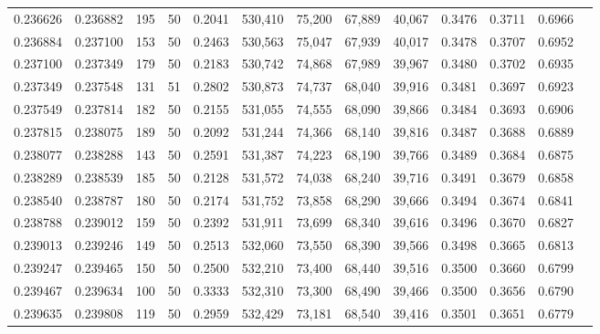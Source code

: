 \begin{tabular}{rrrrrrrrrrrrr}
0.236626 & 0.236882 &   195 &  50 &                                     0.2041 & 530,410 &  75,200 &  67,889 &  40,067 & 0.3476 & 0.3711 & 0.6966 \\
0.236884 & 0.237100 &   153 &  50 &                                     0.2463 & 530,563 &  75,047 &  67,939 &  40,017 & 0.3478 & 0.3707 & 0.6952 \\
0.237100 & 0.237349 &   179 &  50 &                                     0.2183 & 530,742 &  74,868 &  67,989 &  39,967 & 0.3480 & 0.3702 & 0.6935 \\
0.237349 & 0.237548 &   131 &  51 &                                     0.2802 & 530,873 &  74,737 &  68,040 &  39,916 & 0.3481 & 0.3697 & 0.6923 \\
0.237549 & 0.237814 &   182 &  50 &                                     0.2155 & 531,055 &  74,555 &  68,090 &  39,866 & 0.3484 & 0.3693 & 0.6906 \\
0.237815 & 0.238075 &   189 &  50 &                                     0.2092 & 531,244 &  74,366 &  68,140 &  39,816 & 0.3487 & 0.3688 & 0.6889 \\
0.238077 & 0.238288 &   143 &  50 &                                     0.2591 & 531,387 &  74,223 &  68,190 &  39,766 & 0.3489 & 0.3684 & 0.6875 \\
0.238289 & 0.238539 &   185 &  50 &                                     0.2128 & 531,572 &  74,038 &  68,240 &  39,716 & 0.3491 & 0.3679 & 0.6858 \\
0.238540 & 0.238787 &   180 &  50 &                                     0.2174 & 531,752 &  73,858 &  68,290 &  39,666 & 0.3494 & 0.3674 & 0.6841 \\
0.238788 & 0.239012 &   159 &  50 &                                     0.2392 & 531,911 &  73,699 &  68,340 &  39,616 & 0.3496 & 0.3670 & 0.6827 \\
0.239013 & 0.239246 &   149 &  50 &                                     0.2513 & 532,060 &  73,550 &  68,390 &  39,566 & 0.3498 & 0.3665 & 0.6813 \\
0.239247 & 0.239465 &   150 &  50 &                                     0.2500 & 532,210 &  73,400 &  68,440 &  39,516 & 0.3500 & 0.3660 & 0.6799 \\
0.239467 & 0.239634 &   100 &  50 &                                     0.3333 & 532,310 &  73,300 &  68,490 &  39,466 & 0.3500 & 0.3656 & 0.6790 \\
0.239635 & 0.239808 &   119 &  50 &                                     0.2959 & 532,429 &  73,181 &  68,540 &  39,416 & 0.3501 & 0.3651 & 0.6779 \\

\end{tabular}
